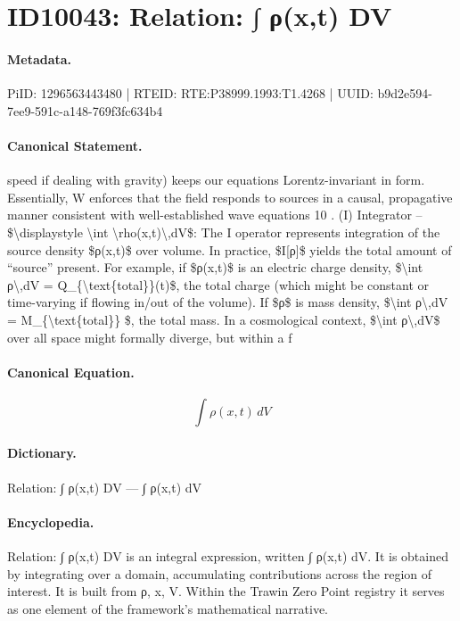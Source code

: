 \section*{ID10043: Relation: ∫ ρ(x,t) DV}
\paragraph{Metadata.}
PiID: 1296563443480 | RTEID: RTE:P38999.1993:T1.4268 | UUID: b9d2e594-7ee9-591c-a148-769f3fc634b4

\paragraph{Canonical Statement.}
speed if dealing with gravity) keeps our equations Lorentz-invariant in form. Essentially, W enforces that the field responds to sources in a causal, propagative manner consistent with well-established wave equations 10 . (I) Integrator – \$\textbackslash{}displaystyle \textbackslash{}int \textbackslash{}rho(x,t)\textbackslash{},dV\$: The I operator represents integration of the source density \$ρ(x,t)\$ over volume. In practice, \$I[ρ]\$ yields the total amount of “source” present. For example, if \$ρ(x,t)\$ is an electric charge density, \$\textbackslash{}int ρ\textbackslash{},dV = Q\_\{\textbackslash{}text\{total\}\}(t)\$, the total charge (which might be constant or time-varying if flowing in/out of the volume). If \$ρ\$ is mass density, \$\textbackslash{}int ρ\textbackslash{},dV = M\_\{\textbackslash{}text\{total\}\} \$, the total mass. In a cosmological context, \$\textbackslash{}int ρ\textbackslash{},dV\$ over all space might formally diverge, but within a f

\paragraph{Canonical Equation.}
\[
\displaystyle \int \rho(x,t)\,dV
\]

\paragraph{Dictionary.}
Relation: ∫ ρ(x,t) DV — ∫ ρ(x,t) dV

\paragraph{Encyclopedia.}
Relation: ∫ ρ(x,t) DV is an integral expression, written ∫ ρ(x,t) dV. It is obtained by integrating over a domain, accumulating contributions across the region of interest. It is built from ρ, x, V. Within the Trawin Zero Point registry it serves as one element of the framework's mathematical narrative.
